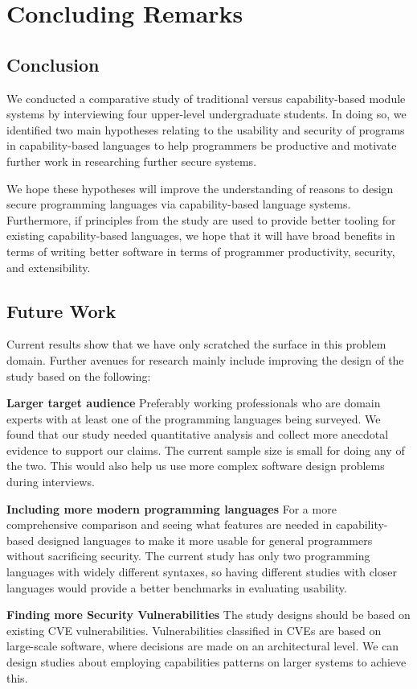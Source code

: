 \section{Concluding Remarks}\label{sec-conclusion}

\subsection{Conclusion}

\noindent
We conducted a comparative study of traditional versus capability-based module systems by interviewing four upper-level undergraduate students. In doing so, we identified two main hypotheses relating to the usability and security of programs in capability-based languages to help programmers be productive and motivate further work in researching further secure systems. %

We hope these hypotheses will improve the understanding of reasons to design secure programming languages via capability-based language systems. Furthermore, if principles from the study are used to provide better tooling for existing capability-based languages, we hope that it will have broad benefits in terms of writing better software in terms of programmer productivity, security, and extensibility.

\subsection{Future Work}

\noindent
Current results show that we have only scratched the surface in this problem domain. Further avenues for research mainly include improving the design of the study based on the following:

\noindent
\textbf{Larger target audience} Preferably working professionals who are domain experts with at least one of the programming languages being surveyed. We found that our study needed quantitative analysis and collect more anecdotal evidence to support our claims. The current sample size is small for doing any of the two. This would also help us use more complex software design problems during interviews.  

\noindent
\textbf{Including more modern programming languages} For a more comprehensive comparison and seeing what features are needed in capability-based designed languages to make it more usable for general programmers without sacrificing security. The current study has only two programming languages with widely different syntaxes, so having different studies with closer languages would provide a better benchmarks in evaluating usability.

\noindent
\textbf{Finding more Security Vulnerabilities} The study designs should be based on existing CVE vulnerabilities. Vulnerabilities classified in CVEs are based on large-scale software, where decisions are made on an architectural level. We can design studies about employing capabilities patterns on larger systems to achieve this.


